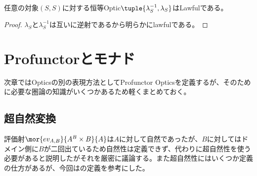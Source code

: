 \documentclass[uplatex,dvipdfmx]{jsarticle}
\begin{document}
  \begin{prop}[恒等Opticのlawful性]  
    任意の対象$(S,S)$に対する恒等Optic$\tuple{\lambda_S^{-1},\lambda_S}$はLawfulである。
  \end{prop}
  \begin{proof}
    $\lambda_S$と$\lambda_S^{-1}$は互いに逆射であるから明らかにlawfulである。
  \end{proof}
  \section{Profunctorとモナド}
  次章ではOpticsの別の表現方法としてProfunctor Opticsを定義するが、そのために必要な圏論の知識がいくつかあるため軽くまとめておく。
  \subsection{超自然変換}
  評価射$\mor{ev_{A,B}}{A^B\times B}{A}$は$A$に対して自然であったが、$B$に対してはドメイン側に$B$が二回出ているため自然性は定義できず、代わりに超自然性を使う必要があると説明したがそれを厳密に議論する。また超自然性にはいくつか定義の仕方があるが、今回は\cite{BCECT}の定義を参考にした。
\end{document}

